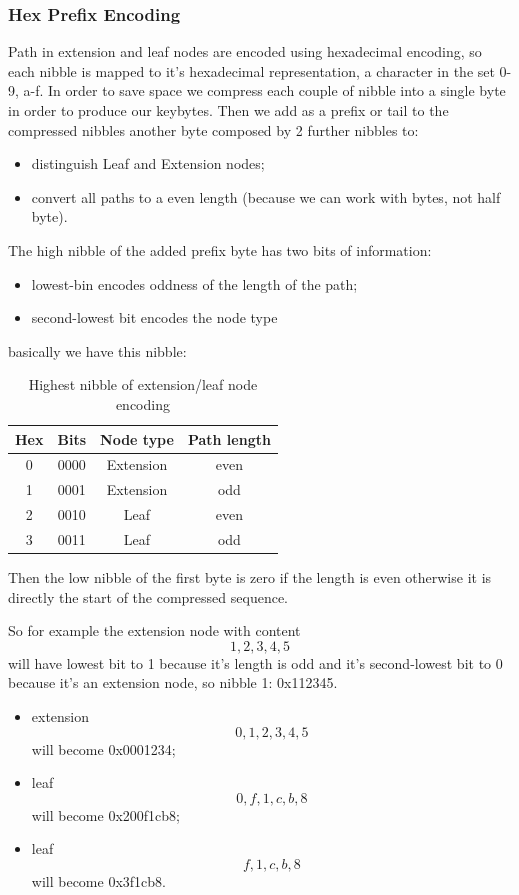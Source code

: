 \subsubsection{Hex Prefix Encoding}
Path in extension and leaf nodes are encoded using hexadecimal encoding, so each nibble is mapped to it's hexadecimal representation, a character in the set 0-9, a-f.
In order to save space we compress each couple of nibble into a single byte in order to produce our keybytes.
Then we add as a prefix or tail to the compressed nibbles another byte composed by 2 further nibbles to:
\begin{itemize}
    \item distinguish Leaf and Extension nodes;
    \item convert all paths to a even length (because we can work with bytes, not half byte).
\end{itemize}
The high nibble of the added prefix byte has two bits of information:
\begin{itemize}
    \item lowest-bin encodes oddness of the length of the path;
    \item second-lowest bit encodes the node type
\end{itemize}
basically we have this nibble:
\begin{table}[H]
    \centering
    \begin{tabular}{c|c|c|c}
        Hex & Bits & Node type & Path length \\
        \hline
        0 & 0000 & Extension & even \\
        1 & 0001 & Extension & odd \\
        2 & 0010 & Leaf & even \\
        3 & 0011 & Leaf & odd \\
    \end{tabular}
    \caption{Highest nibble of extension/leaf node encoding}
\end{table}
Then the low nibble of the first byte is zero if the length is even otherwise it is directly the start of the compressed sequence.

So for example the extension node with content \[1,2,3,4,5\] will have lowest bit to 1 because it's length is odd and it's second-lowest bit to 0 because it's an extension node, so nibble 1: 0x112345.
\begin{itemize}
    \item extension \[0,1,2,3,4,5\] will become 0x0001234;
    \item leaf \[0,f,1,c,b,8\] will become 0x200f1cb8;
    \item leaf \[f,1,c,b,8\] will become 0x3f1cb8.
\end{itemize}

